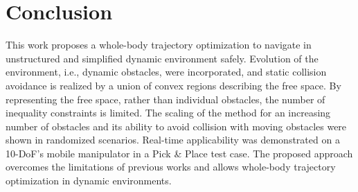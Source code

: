 \section{Conclusion}%
\label{sec:conclusion}

This work proposes a whole-body trajectory optimization to navigate in unstructured and simplified dynamic environment safely. Evolution of the environment, i.e., dynamic obstacles, were incorporated, and static collision avoidance is realized by a union of convex regions describing the free space. By representing the free space, rather than individual obstacles, the number of inequality constraints is limited. The scaling of the method for an increasing number of obstacles and its ability to avoid collision with moving obstacles were shown in randomized scenarios.
Real-time applicability was demonstrated on a 10-DoF's mobile manipulator in a Pick \& Place test case.
The proposed approach overcomes the limitations of previous works and allows whole-body trajectory optimization in dynamic environments. %
%
%
\iffalse
It was shown that coupling of the motion of the mobile robot and the mounted arm dramatically reduces total operational time of the robotic system.

This work proposed an MPC formulation for coupled motion of mobile manipulators using
convex region decomposition to allow safe motions in unknown environments and to reduce
the overall execution time of navigation tasks compared to decoupled approaches.  A new
formulation for collision avoidance in unknown environments was introduced that can fuse
various sensor inputs to create free space regions around individual links.  Simulation
results in randomized test cases show that the gained flexibility by the approach results
in an increase in number of feasible trajectories. At the same time parallelizing the
motion reduces the operation time by $38\%$ on average. The fact that no collision
happened during the test cases highlights the advantage of having guarantees provided by
the MPC formulation. In future works, improved prediction algorithms, which are already
used in mobile robotics, could be integrated. Besides, close-to-singular configurations
that are not prevented in the current formulation, should be addressed in the future.
\fi

